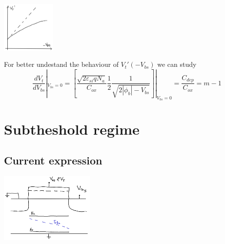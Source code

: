 \centering
\includegraphics[width=0.2\textwidth]{body3.png}\\
\raggedright

For better undestand the behaviour of $V_t'(-V_{bs})$ we can study 
\begin{equation}
\frac{d V_t}{dV_{bs}}|_{V_{bs}=0}=[\frac{\sqrt{2\varepsilon_{si}qN_a}}{C_{ox}}\frac{1}{2}\frac{1}{\sqrt{2|\phi_b|-V_{bs}}}]|_{V_{bs}=0}=\frac{C_{dep}}{C_{ox}}=m-1
\end{equation}

\section{Subtheshold regime}

\subsection{Current expression}

\centering
\includegraphics[width=0.35\textwidth]{subth.png}\\
\raggedright

